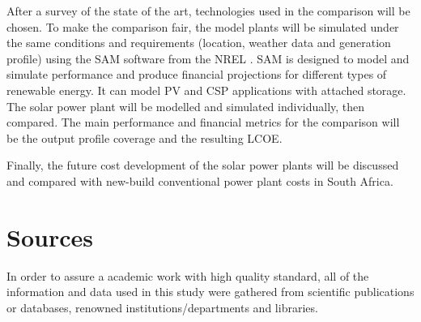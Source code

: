 
After a survey of the state of the art, technologies used in the comparison will be chosen. To make the comparison fair, the model plants will be simulated under the same conditions and requirements (location, weather data and generation profile) using the \ac{SAM} software from the \ac{NREL} \cite{NREL2015}. \ac{SAM} is designed to model and simulate performance and produce financial projections for different types of renewable energy. It can model \ac{PV} and \ac{CSP} applications with attached storage. The solar power plant will be modelled and simulated individually, then compared. The main performance and financial metrics for the comparison will be the output profile coverage and the resulting \ac{LCOE}.


Finally, the future cost development of the solar power plants will be discussed and compared with new-build conventional power plant costs in South Africa.

\section{Sources}
In order to assure a academic work with high quality standard, all of the information and data used in this study were gathered from scientific publications or databases, renowned institutions/departments and libraries.

